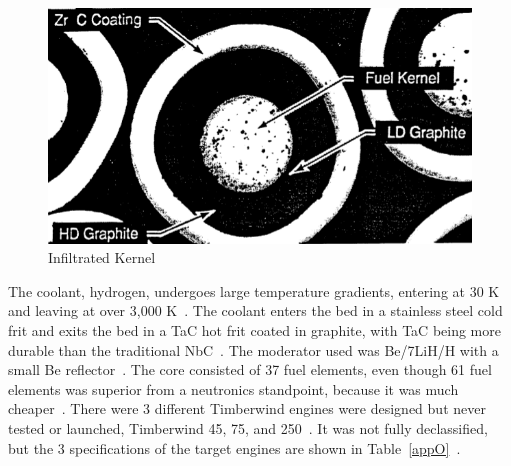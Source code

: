\documentclass{article}
\begin{document}
\begin{figure}[]
	\centering
	\includegraphics[height=0.35\textheight]{fig/appN}
	\caption[Infiltrated Kernel]{Infiltrated Kernel~\cite{haslett1995space}}
	\label{appN}
\end{figure}

The coolant, hydrogen, undergoes large temperature gradients, entering at 30 K and leaving at over 3,000 K~\cite{ludewig1996design}. The coolant enters the bed in a stainless steel cold frit and exits the bed in a TaC hot frit coated in graphite, with TaC being more durable than the traditional NbC~\cite{ludewig1996design}. The moderator used was Be/7LiH/H with a small Be reflector~\cite{haslett1995space}. The core consisted of 37 fuel elements, even though 61 fuel elements was superior from a neutronics standpoint, because it was much cheaper~\cite{haslett1995space}. 
There were 3 different Timberwind engines were designed but never tested or launched, Timberwind 45, 75, and 250~\cite{board2006priorities}. It was not fully declassified, but the 3 specifications of the target engines are shown in Table~\ref{appO}~\cite{board2006priorities}.
\end{document}
